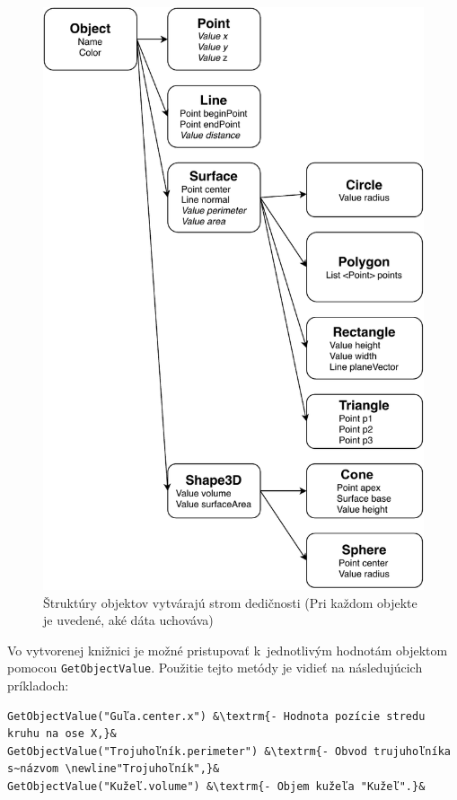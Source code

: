 \begin{figure}[H]
	\centering
	\includegraphics[height=0.95\textheight]{obrazky-figures/Diagram/Draw/Parametric Sctructures Tree.pdf}
	\caption{Štruktúry objektov vytvárajú strom dedičnosti (Pri každom objekte je uvedené, aké dáta uchováva)}
	\label{fig:StromDedicnosti}
\end{figure}
Vo vytvorenej knižnici je možné pristupovať k~jednotlivým hodnotám objektom pomocou 
\texttt{GetObjectValue}. Použitie tejto metódy je vidieť na následujúcich príkladoch:
\begin{lstlisting}
GetObjectValue("Guľa.center.x") &\textrm{- Hodnota pozície stredu kruhu na ose X,}&
GetObjectValue("Trojuhoľník.perimeter") &\textrm{- Obvod trujuhoľníka s~názvom \newline"Trojuhoľník",}&
GetObjectValue("Kužeľ.volume") &\textrm{- Objem kužeľa "Kužeľ".}&
\end{lstlisting}


